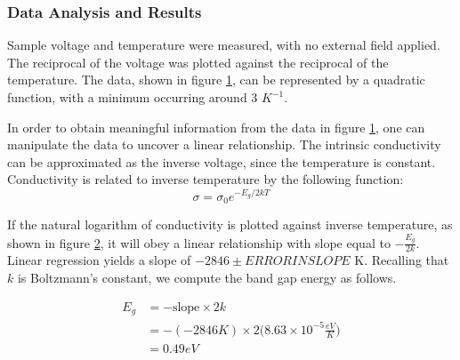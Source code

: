 \documentclass[a4paper]{article}
\begin{document}
\subsubsection{Data Analysis and Results}
\qq Sample voltage and temperature were measured, with no external field applied. The reciprocal of the voltage was plotted against the 
reciprocal of the temperature. The data, shown in figure \ref{task23plot}, can be represented by a quadratic function, with a minimum occurring around 3 $K^{-1}$.

\begin{figure}[H]
\centering
\label{task23plot}
\end{figure}

In order to obtain meaningful information from the data in figure \ref{task23plot}, one can manipulate the data to uncover a linear relationship. The intrinsic conductivity can be approximated as the inverse voltage, since the temperature is constant. Conductivity is related to inverse temperature by the following function:
$$\sigma = \sigma_0 e^{-E_g/2kT}$$

\begin{figure}[H]
\centering
\label{task23plotLINEAR}
\end{figure}

If the natural logarithm of conductivity is plotted against inverse temperature, as shown in figure \ref{task23plotLINEAR}, it will obey 
a linear relationship with slope equal to $- \frac{E_g}{2k}$. Linear regression yields a slope of $-2846 \pm ERRORINSLOPE$ K. Recalling that $k$ is Boltzmann's constant, we compute the band gap energy as follows.

\begin{align*}
E_g &= - \text{slope} \times 2k \\
    &= - (-2846 K) \times 2 
       \Big( 8.63 \times 10^{-5} \frac{eV}{K} \Big) \\
    &= 0.49 eV \\
\end{align*}
\end{document}
